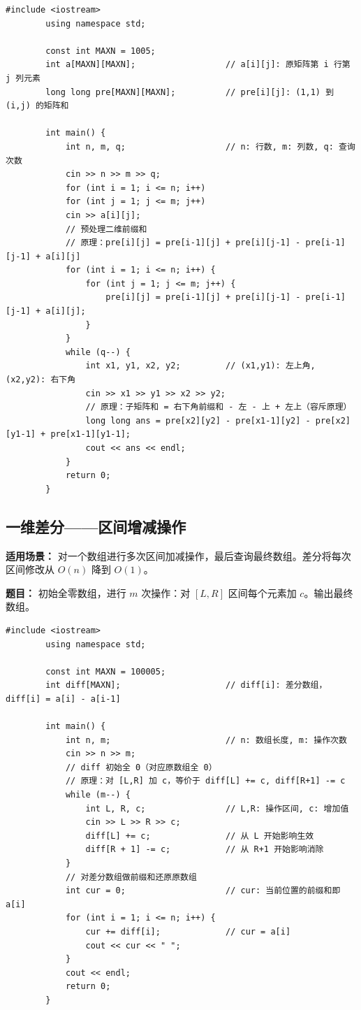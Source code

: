 \documentclass[12pt,a4paper]{ctexart}
\begin{document}
	\begin{lstlisting}[caption={二维前缀和——O(1) 子矩阵和查询}]
		#include <iostream>
		using namespace std;
		
		const int MAXN = 1005;
		int a[MAXN][MAXN];                  // a[i][j]: 原矩阵第 i 行第 j 列元素
		long long pre[MAXN][MAXN];          // pre[i][j]: (1,1) 到 (i,j) 的矩阵和
		
		int main() {
			int n, m, q;                    // n: 行数, m: 列数, q: 查询次数
			cin >> n >> m >> q;
			for (int i = 1; i <= n; i++)
			for (int j = 1; j <= m; j++)
			cin >> a[i][j];
			// 预处理二维前缀和
			// 原理：pre[i][j] = pre[i-1][j] + pre[i][j-1] - pre[i-1][j-1] + a[i][j]
			for (int i = 1; i <= n; i++) {
				for (int j = 1; j <= m; j++) {
					pre[i][j] = pre[i-1][j] + pre[i][j-1] - pre[i-1][j-1] + a[i][j];
				}
			}
			while (q--) {
				int x1, y1, x2, y2;         // (x1,y1): 左上角, (x2,y2): 右下角
				cin >> x1 >> y1 >> x2 >> y2;
				// 原理：子矩阵和 = 右下角前缀和 - 左 - 上 + 左上（容斥原理）
				long long ans = pre[x2][y2] - pre[x1-1][y2] - pre[x2][y1-1] + pre[x1-1][y1-1];
				cout << ans << endl;
			}
			return 0;
		}
	\end{lstlisting}
	
	\subsection{一维差分——区间增减操作}
	\textbf{适用场景：} 对一个数组进行多次区间加减操作，最后查询最终数组。差分将每次区间修改从 $O(n)$ 降到 $O(1)$。
	
	\textbf{题目：} 初始全零数组，进行 $m$ 次操作：对 $[L,R]$ 区间每个元素加 $c$。输出最终数组。
	
	\begin{lstlisting}[caption={一维差分——O(1) 区间增减}]
		#include <iostream>
		using namespace std;
		
		const int MAXN = 100005;
		int diff[MAXN];                     // diff[i]: 差分数组，diff[i] = a[i] - a[i-1]
		
		int main() {
			int n, m;                       // n: 数组长度, m: 操作次数
			cin >> n >> m;
			// diff 初始全 0（对应原数组全 0）
			// 原理：对 [L,R] 加 c，等价于 diff[L] += c, diff[R+1] -= c
			while (m--) {
				int L, R, c;                // L,R: 操作区间, c: 增加值
				cin >> L >> R >> c;
				diff[L] += c;               // 从 L 开始影响生效
				diff[R + 1] -= c;           // 从 R+1 开始影响消除
			}
			// 对差分数组做前缀和还原原数组
			int cur = 0;                    // cur: 当前位置的前缀和即 a[i]
			for (int i = 1; i <= n; i++) {
				cur += diff[i];             // cur = a[i]
				cout << cur << " ";
			}
			cout << endl;
			return 0;
		}
	\end{lstlisting}
	
\end{document}
